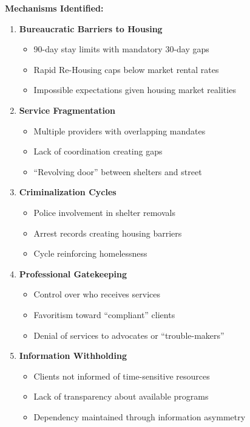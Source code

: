 \documentclass[11pt,letterpaper]{article}
\begin{document}
\textbf{Mechanisms Identified:}
\begin{enumerate}[leftmargin=*]
\item \textbf{Bureaucratic Barriers to Housing}
\begin{itemize}
\item 90-day stay limits with mandatory 30-day gaps
\item Rapid Re-Housing caps below market rental rates
\item Impossible expectations given housing market realities
\end{itemize}

\item \textbf{Service Fragmentation}
\begin{itemize}
\item Multiple providers with overlapping mandates
\item Lack of coordination creating gaps
\item ``Revolving door'' between shelters and street
\end{itemize}

\item \textbf{Criminalization Cycles}
\begin{itemize}
\item Police involvement in shelter removals
\item Arrest records creating housing barriers
\item Cycle reinforcing homelessness
\end{itemize}

\item \textbf{Professional Gatekeeping}
\begin{itemize}
\item Control over who receives services
\item Favoritism toward ``compliant'' clients
\item Denial of services to advocates or ``trouble-makers''
\end{itemize}

\item \textbf{Information Withholding}
\begin{itemize}
\item Clients not informed of time-sensitive resources
\item Lack of transparency about available programs
\item Dependency maintained through information asymmetry
\end{itemize}
\end{enumerate}
\end{document}

